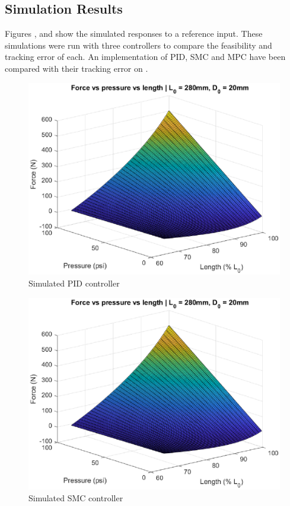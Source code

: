 \documentclass[11pt,a4paper]{article}
\begin{document}
\subsection{Simulation Results}
\label{sub:simulation_results}
Figures ,  and  show the simulated responses to a reference input. These simulations were run with three controllers to compare the feasibility and tracking error of each. An implementation of PID, SMC and MPC have been compared with their tracking error on .

\begin{figure}[!hbt]
    \centering
    \includegraphics[scale=0.8]{staticmap.eps}
    \caption{Simulated PID controller}
    \label{fig:simulated_pid}
\end{figure}
\begin{figure}[!hbt]
    \centering
    \includegraphics[scale=0.8]{staticmap.eps}
    \caption{Simulated SMC controller}
    \label{fig:simulated_smc}
\end{figure}
\end{document}
